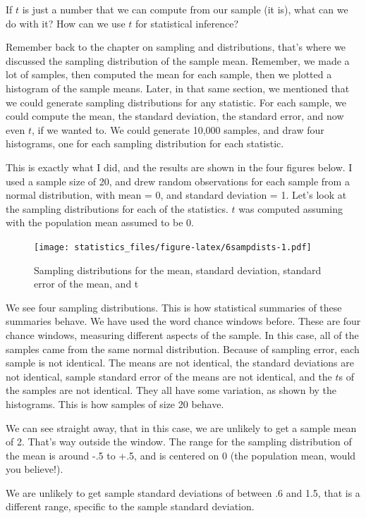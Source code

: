 \documentclass[]{book}
\begin{document}
If \(t\) is just a number that we can compute from our sample (it is), what can we do with it? How can we use \(t\) for statistical inference?

Remember back to the chapter on sampling and distributions, that's where we discussed the sampling distribution of the sample mean. Remember, we made a lot of samples, then computed the mean for each sample, then we plotted a histogram of the sample means. Later, in that same section, we mentioned that we could generate sampling distributions for any statistic. For each sample, we could compute the mean, the standard deviation, the standard error, and now even \(t\), if we wanted to. We could generate 10,000 samples, and draw four histograms, one for each sampling distribution for each statistic.

This is exactly what I did, and the results are shown in the four figures below. I used a sample size of 20, and drew random observations for each sample from a normal distribution, with mean = 0, and standard deviation = 1. Let's look at the sampling distributions for each of the statistics. \(t\) was computed assuming with the population mean assumed to be 0.

\begin{figure}
\centering
\texttt{[image: statistics\_files/figure-latex/6sampdists-1.pdf]}
\caption{\label{fig:6sampdists}Sampling distributions for the mean, standard deviation, standard error of the mean, and t}
\end{figure}

We see four sampling distributions. This is how statistical summaries of these summaries behave. We have used the word chance windows before. These are four chance windows, measuring different aspects of the sample. In this case, all of the samples came from the same normal distribution. Because of sampling error, each sample is not identical. The means are not identical, the standard deviations are not identical, sample standard error of the means are not identical, and the \(t\)s of the samples are not identical. They all have some variation, as shown by the histograms. This is how samples of size 20 behave.

We can see straight away, that in this case, we are unlikely to get a sample mean of 2. That's way outside the window. The range for the sampling distribution of the mean is around -.5 to +.5, and is centered on 0 (the population mean, would you believe!).

We are unlikely to get sample standard deviations of between .6 and 1.5, that is a different range, specific to the sample standard deviation.
\end{document}
